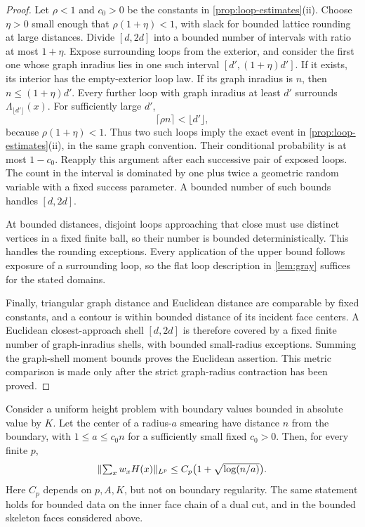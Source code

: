 \begin{proof}
Let $\rho<1$ and $c_0>0$ be the constants in
\cref{prop:loop-estimates}(ii).  Choose $\eta>0$ small enough that
$\rho(1+\eta)<1$, with slack for bounded lattice rounding at large
distances.  Divide $[d,2d]$ into a bounded
number of intervals with ratio at most $1+\eta$.  Expose surrounding loops
from the exterior, and consider the first one whose graph inradius
lies in one such interval $[d', (1+\eta)d']$.  If it exists, its interior
has the empty-exterior loop law.  If its graph inradius is $n$, then
$n\le(1+\eta)d'$.  Every further loop with graph inradius at least $d'$
surrounds $\Lambda_{\lfloor d'\rfloor}(x)$.  For sufficiently large $d'$,
\[
 \lceil\rho n\rceil<\lfloor d'\rfloor,
\]
because $\rho(1+\eta)<1$.  Thus two such loops imply the exact event
in \cref{prop:loop-estimates}(ii), in the same graph convention.  Their
conditional probability is at most $1-c_0$.
Reapply this argument after each successive pair of exposed loops.
The count in the interval is dominated by one plus twice a geometric
random variable with a fixed success parameter.  A bounded number of
such bounds handles $[d,2d]$.

At bounded distances, disjoint loops approaching that close must use
distinct vertices in a fixed finite ball, so their number is bounded
deterministically.  This handles the rounding exceptions.  Every application
of the upper bound follows exposure of a surrounding loop, so the flat
loop description in \cref{lem:gray} suffices for the stated domains.

Finally, triangular graph distance and Euclidean distance are comparable
by fixed constants, and a contour is within bounded distance of its
incident face centers.  A Euclidean closest-approach shell $[d,2d]$ is
therefore covered by a fixed finite number of graph-inradius shells,
with bounded small-radius exceptions.  Summing the graph-shell moment
bounds proves the Euclidean assertion.  This metric comparison is made
only after the strict graph-radius contraction has been proved.
\end{proof}

\begin{proposition}\label{prop:smearing-moments}
Consider a uniform height problem with boundary values bounded in absolute
value by $K$.  Let the center of a radius-$a$ smearing have distance $n$
from the boundary, with $1\leq a\leq c_0n$ for a sufficiently small fixed
$c_0>0$.  Then, for every finite $p$,
\begin{equation}\label{eq:smearing-moments}
 \lVert\textstyle\sum_xw_xH(x)\rVert_{L^p}
 \leq C_p\bigl(1+\sqrt{\log(n/a)}\bigr).
\end{equation}
Here $C_p$ depends on $p,A,K$, but not on boundary regularity.  The same
statement holds for bounded data on the inner face chain of a dual cut,
and in the bounded skeleton faces considered above.
\end{proposition}

